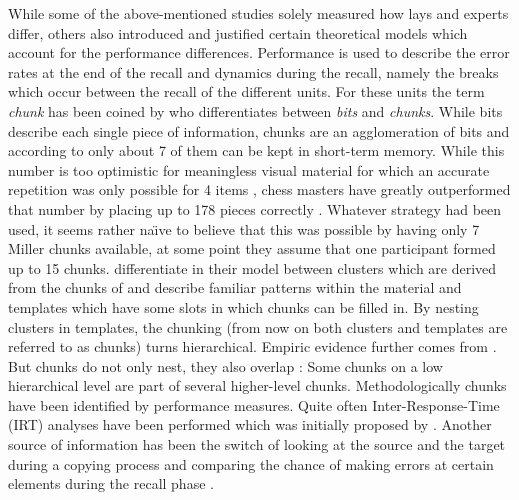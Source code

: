 While some of the above-mentioned studies solely measured how lays and experts differ, others also introduced and justified certain theoretical models which account for the performance differences.
Performance is used to describe the error rates at the end of the recall and dynamics during the recall, namely the breaks which occur between the recall of the different units.
For these units the term \textit{chunk} has been coined by \textcite{miller1956magical} who differentiates between \textit{bits} and \textit{chunks}.
While bits describe each single piece of information, chunks are an agglomeration of bits and according to  only about 7 of them can be kept in short-term memory.
While this number is too optimistic for meaningless visual material for which an accurate repetition was only possible for 4 items \cite{luck1997capacity}, chess masters have greatly outperformed that number by placing up to 178 pieces correctly \cite{gobet1996templates}.
Whatever strategy had been used, it seems rather na\"{\i}ve to believe that this was possible by having only 7 Miller chunks available, at some point they assume that one participant formed up to 15 chunks.
\textcite{gobet1996templates} differentiate in their model between clusters which are derived from the chunks of \textcite{chase1973mind} and describe familiar patterns within the material and templates which have some slots in which chunks can be filled in.
By nesting clusters in templates, the chunking (from now on both clusters and templates are referred to as chunks) turns hierarchical.
Empiric evidence further comes from \textcite{moss2006role}.
But chunks do not only nest, they also overlap \cite{reitman1976skilled}:
Some chunks on a low hierarchical level are part of several higher-level chunks.
Methodologically chunks have been identified by performance measures.
Quite often Inter-Response-Time (IRT) analyses have been performed \parencites(e.g.,)(){egan1979chunking,reitman1976skilled} which was initially proposed by \textcite{chase1973perception}.
Another source of information has been the switch of looking at the source and the target during a copying process \cite{reitman1976skilled} and comparing the chance of making errors at certain elements during the recall phase \cite{moss2006role}.

